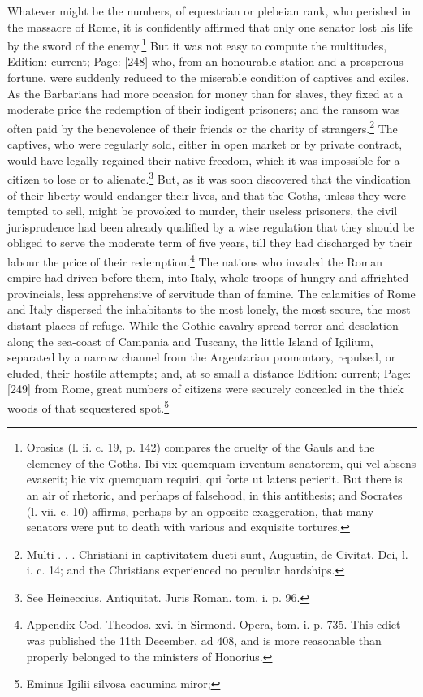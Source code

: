 Whatever might be the numbers, of equestrian or plebeian rank, who perished in the massacre of Rome, it is confidently affirmed that only one senator lost his life by the sword of the enemy.\footnote{Orosius (l. ii. c. 19, p. 142) compares the cruelty of the Gauls and the clemency of the Goths. Ibi vix quemquam inventum senatorem, qui vel absens evaserit; hic vix quemquam requiri, qui forte ut latens perierit. But there is an air of rhetoric, and perhaps of falsehood, in this antithesis; and Socrates (l. vii. c. 10) affirms, perhaps by an opposite exaggeration, that many senators were put to death with various and exquisite tortures.} But it was not easy to compute the multitudes, Edition: current; Page: [248] who, from an honourable station and a prosperous fortune, were suddenly reduced to the miserable condition of captives and exiles. As the Barbarians had more occasion for money than for slaves, they fixed at a moderate price the redemption of their indigent prisoners; and the ransom was often paid by the benevolence of their friends or the charity of strangers.\footnote{Multi . . . Christiani in captivitatem ducti sunt, Augustin, de Civitat. Dei, l. i. c. 14; and the Christians experienced no peculiar hardships.} The captives, who were regularly sold, either in open market or by private contract, would have legally regained their native freedom, which it was impossible for a citizen to lose or to alienate.\footnote{See Heineccius, Antiquitat. Juris Roman. tom. i. p. 96.} But, as it was soon discovered that the vindication of their liberty would endanger their lives, and that the Goths, unless they were tempted to sell, might be provoked to murder, their useless prisoners, the civil jurisprudence had been already qualified by a wise regulation that they should be obliged to serve the moderate term of five years, till they had discharged by their labour the price of their redemption.\footnote{Appendix Cod. Theodos. xvi. in Sirmond. Opera, tom. i. p. 735. This edict was published the 11th December, ad 408, and is more reasonable than properly belonged to the ministers of Honorius.} The nations who invaded the Roman empire had driven before them, into Italy, whole troops of hungry and affrighted provincials, less apprehensive of servitude than of famine. The calamities of Rome and Italy dispersed the inhabitants to the most lonely, the most secure, the most distant places of refuge. While the Gothic cavalry spread terror and desolation along the sea-coast of Campania and Tuscany, the little Island of Igilium, separated by a narrow channel from the Argentarian promontory, repulsed, or eluded, their hostile attempts; and, at so small a distance Edition: current; Page: [249] from Rome, great numbers of citizens were securely concealed in the thick woods of that sequestered spot.\footnote{Eminus Igilii silvosa cacumina miror;

}
